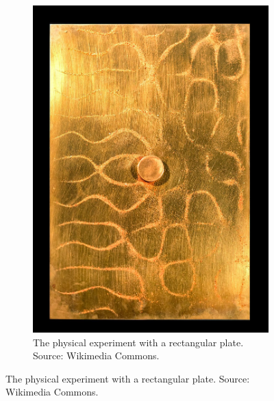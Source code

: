 \documentclass[11pt]{article}
\begin{document}
\begin{figure}
\begin{subfigure}[h]{0.4\textwidth}
		\includegraphics[width=\textwidth]{Figures/chladni_plate.jpg}
		\caption{The physical experiment with a rectangular plate. Source: Wikimedia Commons.}
		\label{fig:chladni-plate}
	\end{subfigure}
\end{figure}
\end{document}
